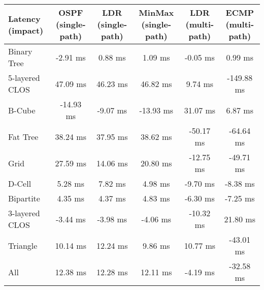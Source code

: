 \begin{tabular}{l|ccccc}
Latency (impact) & OSPF (single-path) & LDR (single-path) & MinMax (single-path) & LDR (multi-path) & ECMP (multi-path) \\
\hline
Binary Tree      & -2.91 ms           & 0.88 ms           & 1.09 ms              & -0.05 ms         & 0.99 ms           \\
5-layered CLOS   & 47.09 ms           & 46.23 ms          & 46.82 ms             & 9.74 ms          & -149.88 ms        \\
B-Cube           & -14.93 ms          & -9.07 ms          & -13.93 ms            & 31.07 ms         & 6.87 ms           \\
Fat Tree         & 38.24 ms           & 37.95 ms          & 38.62 ms             & -50.17 ms        & -64.64 ms         \\
Grid             & 27.59 ms           & 14.06 ms          & 20.80 ms             & -12.75 ms        & -49.71 ms         \\
D-Cell           & 5.28 ms            & 7.82 ms           & 4.98 ms              & -9.70 ms         & -8.38 ms          \\
Bipartite        & 4.35 ms            & 4.37 ms           & 4.83 ms              & -6.30 ms         & -7.25 ms          \\
3-layered CLOS   & -3.44 ms           & -3.98 ms          & -4.06 ms             & -10.32 ms        & 21.80 ms          \\
Triangle         & 10.14 ms           & 12.24 ms          & 9.86 ms              & 10.77 ms         & -43.01 ms         \\
All              & 12.38 ms           & 12.28 ms          & 12.11 ms             & -4.19 ms         & -32.58 ms         \\
\end{tabular}